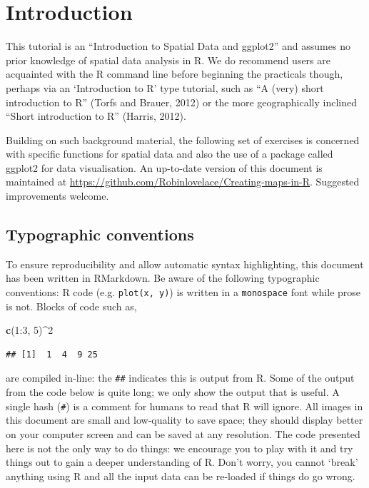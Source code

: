 \documentclass[]{article}
\newenvironment{Shaded}{}{}
\newcommand{\KeywordTok}[1]{\textcolor[rgb]{0.00,0.44,0.13}{\textbf{{#1}}}}
\newcommand{\DecValTok}[1]{\textcolor[rgb]{0.25,0.63,0.44}{{#1}}}
\newcommand{\NormalTok}[1]{{#1}}
\begin{document}
\section{Introduction}

This tutorial is an ``Introduction to Spatial Data and ggplot2'' and
assumes no prior knowledge of spatial data analysis in R. We do
recommend users are acquainted with the R command line before beginning
the practicals though, perhaps via an `Introduction to R' type tutorial,
such as ``A (very) short introduction to R'' (Torfs and Brauer, 2012) or
the more geographically inclined ``Short introduction to R'' (Harris,
2012).

Building on such background material, the following set of exercises is
concerned with specific functions for spatial data and also the use of a
package called ggplot2 for data visualisation. An up-to-date version of
this document is maintained at
\href{https://github.com/Robinlovelace/Creating-maps-in-R/blob/master/intro-spatial-rl.pdf}{https://github.com/Robinlovelace/Creating-maps-in-R}.
Suggested improvements welcome.

\subsection{Typographic conventions}

To ensure reproducibility and allow automatic syntax highlighting, this
document has been written in RMarkdown. Be aware of the following
typographic conventions: R code (e.g. \texttt{plot(x, y)}) is written in
a \texttt{monospace} font while prose is not. Blocks of code such as,

\begin{Shaded}
\begin{Highlighting}[]
\KeywordTok{c}\NormalTok{(}\DecValTok{1}\NormalTok{:}\DecValTok{3}\NormalTok{, }\DecValTok{5}\NormalTok{)^}\DecValTok{2}
\end{Highlighting}
\end{Shaded}
\begin{verbatim}
## [1]  1  4  9 25
\end{verbatim}
are compiled in-line: the \texttt{\#\#} indicates this is output from R.
Some of the output from the code below is quite long; we only show the
output that is useful. A single hash (\texttt{\#}) is a comment for
humans to read that R will ignore. All images in this document are small
and low-quality to save space; they should display better on your
computer screen and can be saved at any resolution. The code presented
here is not the only way to do things: we encourage you to play with it
and try things out to gain a deeper understanding of R. Don't worry, you
cannot `break' anything using R and all the input data can be re-loaded
if things do go wrong.
\end{document}
